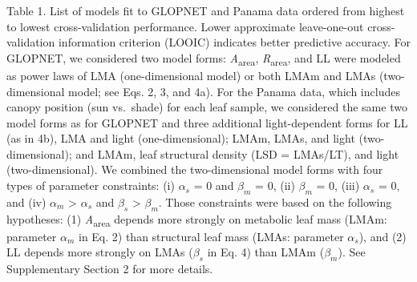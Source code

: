 \documentclass[
  12pt,
  letterpaper,
  DIV=11,
  numbers=noendperiod]{scrartcl}
\begin{document}
Table 1. List of models fit to GLOPNET and Panama data ordered from
highest to lowest cross-validation performance. Lower approximate
leave-one-out cross-validation information criterion (LOOIC) indicates
better predictive accuracy. For GLOPNET, we considered two model forms:
\emph{A}\textsubscript{area}, \emph{R}\textsubscript{area}, and LL were
modeled as power laws of LMA (one-dimensional model) or both LMAm and
LMAs (two-dimensional model; see Eqs. 2, 3, and 4a). For the Panama
data, which includes canopy position (sun vs.~shade) for each leaf
sample, we considered the same two model forms as for GLOPNET and three
additional light-dependent forms for LL (as in 4b), LMA and light
(one-dimensional); LMAm, LMAs, and light (two-dimensional); and LMAm,
leaf structural density (LSD = LMAs/LT), and light (two-dimensional). We
combined the two-dimensional model forms with four types of parameter
constraints: (i) \(\alpha_s\) = 0 and \(\beta_m\) = 0, (ii) \(\beta_m\)
= 0, (iii) \(\alpha_s\) = 0, and (iv) \(\alpha_m\) \textgreater{}
\(\alpha_s\) and \(\beta_s\) \textgreater{} \(\beta_m\). Those
constraints were based on the following hypotheses: (1)
\emph{A}\textsubscript{area} depends more strongly on metabolic leaf
mass (LMAm: parameter \(\alpha_m\) in Eq. 2) than structural leaf mass
(LMAs: parameter \(\alpha_s\)), and (2) LL depends more strongly on LMAs
(\(\beta_s\) in Eq. 4) than LMAm (\(\beta_m\)). See Supplementary
Section 2 for more details.
\end{document}
